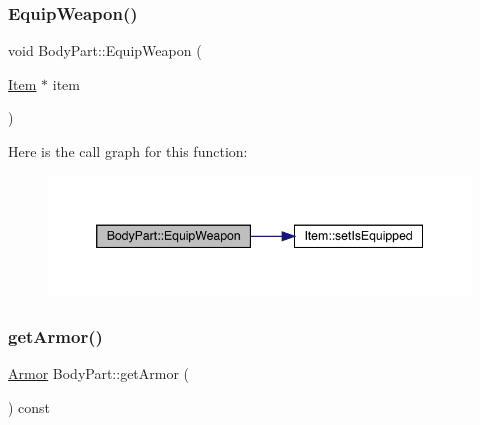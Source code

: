 \mbox{\label{class_body_part_a6af5139c60c7b96bff6d8768c9ef8f22}} 
\subsubsection{\texorpdfstring{Equip\+Weapon()}{EquipWeapon()}}
{\footnotesize\ttfamily void Body\+Part\+::\+Equip\+Weapon (\begin{DoxyParamCaption}\item[{\mbox{\hyperlink{class_item}{Item}} $\ast$}]{item }\end{DoxyParamCaption})}

Here is the call graph for this function\+:
\nopagebreak
\begin{figure}[H]
\begin{center}
\leavevmode
\includegraphics[width=346pt]{class_body_part_a6af5139c60c7b96bff6d8768c9ef8f22_cgraph}
\end{center}
\end{figure}
\mbox{\label{class_body_part_a84df009b0da129c07a84a50e083f33d8}} 
\subsubsection{\texorpdfstring{get\+Armor()}{getArmor()}}
{\footnotesize\ttfamily \mbox{\hyperlink{class_armor}{Armor}} Body\+Part\+::get\+Armor (\begin{DoxyParamCaption}{ }\end{DoxyParamCaption}) const}

\mbox{\label{class_body_part_a7c4d742811e49a2c97b9bec6c1785e94}} 
